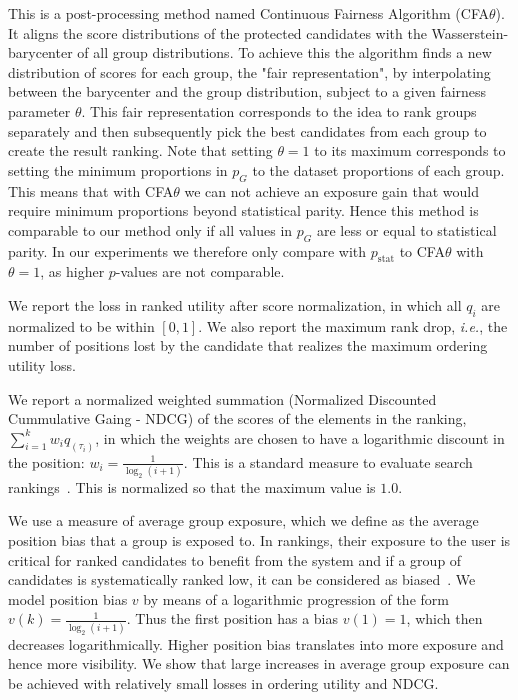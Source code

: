  This is a post-processing method named Continuous Fairness Algorithm (CFA$\theta$). It aligns the score distributions of the protected candidates with the Wasserstein-barycenter of all group distributions.
%
To achieve this the algorithm finds a new distribution of scores for each group, the "fair representation", by interpolating between the barycenter and the group distribution, subject to a given fairness parameter $\theta$.
%
This fair representation corresponds to the idea to rank groups separately and then subsequently pick the best candidates from each group to create the result ranking.
%
Note that setting $\theta=1$ to its maximum corresponds to setting the minimum proportions in $p_G$ to the dataset proportions of each group.
%
This means that with CFA$\theta$ we can not achieve an exposure gain that would require minimum proportions beyond statistical parity.
%
Hence this method is comparable to our method only if all values in $p_G$ are less or equal to statistical parity.
%
In our experiments we therefore only compare \algoFAIR with $p_{\text{stat}}$ to CFA$\theta$ with $\theta=1$, as higher $p$-values are not comparable.


 We report the loss in ranked utility after score normalization, in which all $q_i$ are normalized to be within $[0, 1]$.
%
We also report the maximum rank drop, {\em i.e.}, the number of positions lost by the candidate that realizes the maximum ordering utility loss.


%
We report a normalized weighted summation (Normalized Discounted Cummulative Gaing - NDCG) of the scores of the elements in the ranking, $\sum_{i=1}^{k} w_i q_{(\tau_i)}$, in which the weights are chosen to have a logarithmic discount in the position:  $w_i = \frac{1}{\log_2 (i+1)}$. This is a standard measure to evaluate search rankings~\cite{jarvelin2002cumulated}.
This is normalized so that the maximum value is $1.0$.


 We use a measure of average group exposure, which we define as the average position bias that a group is exposed to.
%
In rankings, their exposure to the user is critical for ranked candidates to benefit from the system and if a group of candidates is systematically ranked low, it can be considered as biased~\cite{friedman1996bias}.
%
We model position bias $v$ by means of a logarithmic progression of the form $v(k) = \frac{1}{\log_2(i+1)}$.
%
Thus the first position has a bias $v(1)=1$, which then decreases logarithmically.
%
Higher position bias translates into more exposure and hence more visibility.
%
We show that large increases in average group exposure can be achieved with relatively small losses in ordering utility and NDCG.


